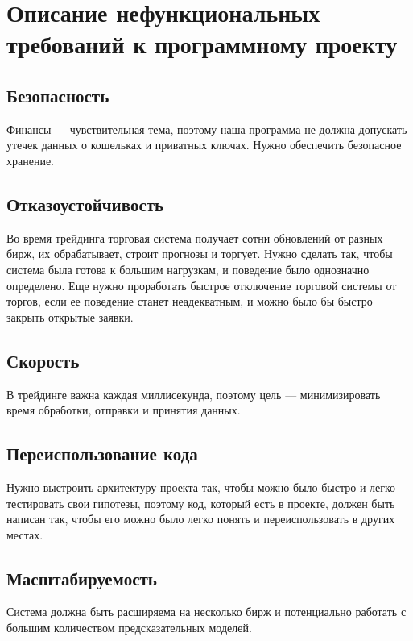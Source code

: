 \section{Описание нефункциональных требований к программному проекту}

\subsection{Безопасность}
Финансы — чувствительная тема, поэтому наша программа не должна допускать утечек данных о кошельках и приватных ключах. Нужно обеспечить безопасное хранение.

\subsection{Отказоустойчивость}
Во время трейдинга торговая система получает сотни обновлений от разных бирж, их обрабатывает, строит прогнозы и торгует. Нужно сделать так, чтобы система была готова к большим нагрузкам, и поведение было однозначно определено. Еще нужно проработать быстрое отключение торговой системы от торгов, если ее поведение станет неадекватным, и можно было бы быстро закрыть открытые заявки.

\subsection{Скорость}
В трейдинге важна каждая миллисекунда, поэтому цель — минимизировать время обработки, отправки и принятия данных.

\subsection{Переиспользование кода}
Нужно выстроить архитектуру проекта так, чтобы можно было быстро и легко тестировать свои гипотезы, поэтому код, который есть в проекте, должен быть написан так, чтобы его можно было легко понять и переиспользовать в других местах.

\subsection{Масштабируемость}
Система должна быть расширяема на несколько бирж и потенциально работать с большим количеством предсказательных моделей.